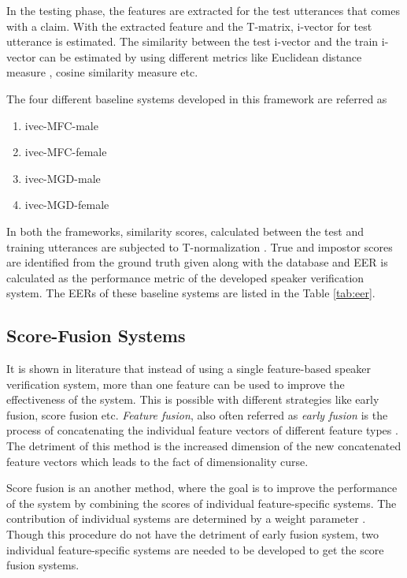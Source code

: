 \documentclass{article}
\begin{document}
In the testing phase, the features are extracted for the test utterances that comes with a claim. With the extracted feature and the T-matrix, i-vector for test utterance is estimated. The similarity between the test i-vector and the train i-vector can be estimated  by using different metrics like Euclidean distance measure \cite{euclid}, cosine similarity measure \cite{z_norm_cosine} etc. 

The four different baseline systems developed in this framework are referred as 
\begin{enumerate}
\item ivec-MFC-male
\item ivec-MFC-female
\item ivec-MGD-male
\item ivec-MGD-female
\end{enumerate}

In both the frameworks, similarity scores, calculated between the test and training utterances are subjected to T-normalization \cite{tnorm}. True and impostor scores are identified from the ground truth given along with the database and EER is calculated as the performance metric of the developed speaker verification system. The EERs of these baseline systems are listed in the Table \ref{tab:eer}.

\subsection{Score-Fusion Systems}
\label{subsec:scoreFusion}
	It is shown in literature that instead of using a single feature-based speaker verification system, more than one feature can be used to improve the effectiveness of the system. This is possible with different strategies like early fusion, score fusion etc. {\it Feature fusion}, also often referred as {\it early fusion} is the process of concatenating the individual feature vectors of different feature types \cite{padmanInterspeech2010}. The detriment of this method is the increased dimension of the new concatenated feature vectors which leads to the fact of dimensionality curse. 
	
	Score fusion is an another method, where the goal is to improve the performance of the system by combining the scores of individual feature-specific systems. The contribution of individual systems are determined by a weight parameter \cite{scoreFusion}. Though this procedure do not have the detriment of early fusion system, two individual feature-specific systems are needed to be developed to get the score fusion systems.
	 
\end{document}
